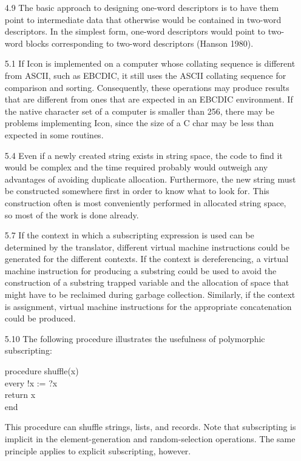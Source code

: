 \begin{itemize}
\goodbreak\item[4.9]
 The basic approach to designing one-word descriptors is to have them
point to intermediate data that otherwise would be contained in two-word
descriptors. In the simplest form, one-word descriptors would point to
two-word blocks corresponding to two-word descriptors (Hanson 1980).

\goodbreak\item[5.1]
 If Icon is implemented on a computer whose collating sequence is different 
from ASCII, such as EBCDIC, it still uses the ASCII collating
sequence for comparison and sorting. Consequently, these operations may
produce results that are different from ones that are expected in an
EBCDIC environment. If the native character set of a computer is smaller
than 256, there may be problems implementing Icon, since the size of a C
char may be less than expected in some routines.

\goodbreak\item[5.4]
Even if a newly created string exists in string space, the code to find it
would be complex and the time required probably would outweigh any
advantages of avoiding duplicate allocation. Furthermore, the new string
must be constructed somewhere first in order to know what to look for.
This construction often is most conveniently performed in allocated string
space, so most of the work is done already.

\goodbreak\item[5.7]
If the context in which a subscripting expression is used can be determined
by the translator, different virtual machine instructions could be
generated for the different contexts. If the context is dereferencing, a virtual
machine instruction for producing a substring could be used to avoid
the construction of a substring trapped variable and the allocation of
space that might have to be reclaimed during garbage collection. Similarly,
if the context is assignment, virtual machine instructions for the
appropriate concatenation could be produced.

\goodbreak\item[5.10]
The following procedure illustrates the usefulness of polymorphic subscripting:
\begin{iconcode}
procedure shuffle(x)\\
\>every !x := ?x\\
\>return x\\
end
\end{iconcode}
This procedure can shuffle strings, lists, and records. Note that subscripting
is implicit in the element-generation and random-selection operations.
The same principle applies to explicit subscripting, however.


\end{itemize}
